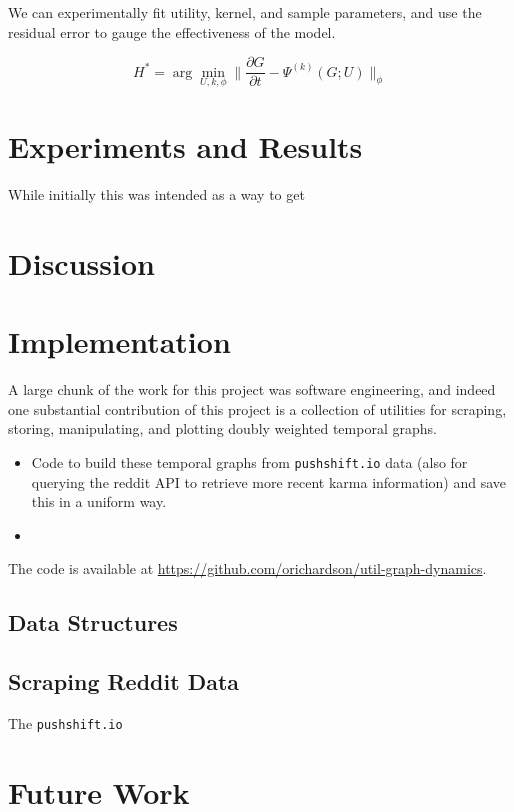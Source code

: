 \documentclass{article}
\theoremstyle{definition}
\begin{document}
	We can experimentally fit utility, kernel, and sample parameters, and use the residual error to gauge the effectiveness of the model.
	
	\[ H^* = \arg\min_{U,k,\phi} \Big\lVert \frac{\partial G}{\partial t} - \Psi^{(k)}(G;U)  \Big\rVert_\phi \]
	
	\section{Experiments and Results}
	
	While initially this was intended as a way to get 
	
	
	
	\section{Discussion}
	
	\section{Implementation}
	A large chunk of the work for this project was software engineering, and indeed one substantial contribution of this project is a collection of utilities for scraping, storing, manipulating, and plotting doubly weighted temporal graphs.
	
	\begin{itemize}
		\item Code to build these temporal graphs from \texttt{pushshift.io} data (also for querying the reddit API to retrieve more recent karma information) and save this in a uniform way.
		
		\item 
	\end{itemize}
	
	
	The code is available at \url{https://github.com/orichardson/util-graph-dynamics}. 
	
	\subsection{Data Structures}
	
	\subsection{Scraping Reddit Data}
	The \texttt{pushshift.io}
	
	\section{Future Work}
	
\end{document}

